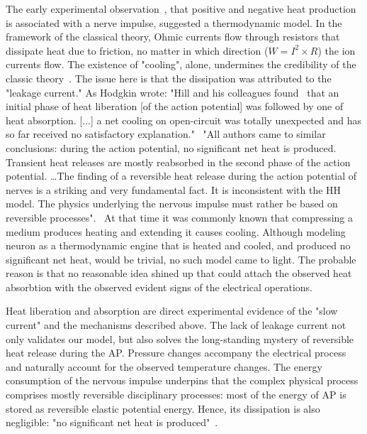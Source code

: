 \ifx\magyar\undefined
The early experimental observation~\cite{HeatProductionNeuron:1958}, that positive and negative heat production is associated with a nerve impulse, suggested a thermodynamic model. 
In the framework of the classical
theory, Ohmic currents ﬂow through resistors that dissipate heat due to
friction, no matter in which direction ($W=I^2\times R$) the ion currents ﬂow.
The existence of "cooling", alone, undermines the credibility of the classic theory~\cite{HEIMBURGReversibleHeatProduction:2021}.
The issue here is that the dissipation was attributed to the "leakage current."  
As Hodgkin wrote: "Hill and his colleagues found~\cite{HeatProductionNeuron:1958} that an initial phase of heat liberation [of the action potential] was followed by one of
heat absorption. [...] a net cooling on open-circuit was totally unexpected
and has so far received no satisfactory explanation."~\cite{HodgkinConduction:1964}
"All authors came to similar conclusions: during
the action potential, no signiﬁcant net heat is produced. Transient heat releases are mostly reabsorbed in the second phase of the action potential. \dots The ﬁnding of a reversible heat release during the action potential of
nerves is a striking and very fundamental fact. It is inconsistent with the
\gls{HH} model. The physics underlying the nervous impulse
must rather be based on reversible processes".~\cite{ThermalBiophysics:2007} 
At that time it was commonly known that compressing a
medium produces heating and extending it causes cooling.
Although modeling neuron as a thermodynamic engine 
that is heated and cooled, and produced no signiﬁcant net heat, would be trivial, no such model came to light.
The probable reason is that no reasonable idea
shined up that could attach the observed heat absorbtion
with the observed evident signs of the electrical operations.

\else

\fi


\ifx\magyar\undefined

Heat liberation and absorption are direct experimental evidence of the "slow current" and the mechanisms described above.
The lack of leakage current
not only validates our model, but also solves the long-standing mystery of reversible heat release during the \gls{AP}.
Pressure changes accompany the electrical process and naturally account for the observed temperature changes.
The energy consumption of the nervous impulse underpins that the complex physical process comprises mostly reversible disciplinary processes:
most of the energy of \gls{AP} is stored as reversible elastic potential energy. Hence, its dissipation is also negligible: "no signiﬁcant net heat is produced"~\cite{ThermalBiophysics:2007}. 

